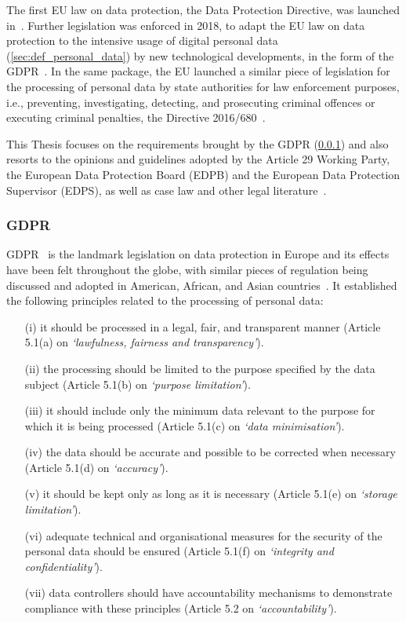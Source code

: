 The first EU law on data protection, the Data Protection Directive, was launched in~\citeyear{noauthor_directive_1995}.
Further legislation was enforced in 2018, to adapt the EU law on data protection to the intensive usage of digital personal data (\ref{sec:def_personal_data}) by new technological developments, in the form of the GDPR~\citeyearpar{noauthor_regulation_2016}.
In the same package, the EU launched a similar piece of legislation for the processing of personal data by state authorities for law enforcement purposes, i.e., preventing, investigating, detecting, and prosecuting criminal offences or executing criminal penalties, the Directive 2016/680~\citeyearpar{noauthor_directive_2016}.

This Thesis focuses on the requirements brought by the GDPR (\ref{sec:def_gdpr}) and also resorts to the opinions and guidelines adopted by the Article 29 Working Party, the European Data Protection Board (EDPB) and the European Data Protection Supervisor (EDPS), as well as case law and other legal literature~\citep{european_union_agency_for_fundamental_rights_and_council_of_europe_handbook_2018}.

\subsubsection{GDPR}
\label{sec:def_gdpr}

GDPR~\citeyearpar{noauthor_regulation_2016} is the landmark legislation on data protection in Europe and its effects have been felt throughout the globe, with similar pieces of regulation being discussed and adopted in American, African, and Asian countries~\citep{bradford_brussels_2019}.
It established the following principles related to the processing of personal data:
\begin{enumerate}
    \item [(i)] it should be processed in a legal, fair, and transparent manner (Article 5.1(a) on \textit{`lawfulness, fairness and transparency'}).
    \item [(ii)] the processing should be limited to the purpose specified by the data subject (Article 5.1(b) on \textit{`purpose limitation'}).
    \item [(iii)] it should include only the minimum data relevant to the purpose for which it is being processed (Article 5.1(c) on \textit{`data minimisation'}).
    \item [(iv)] the data should be accurate and possible to be corrected when necessary (Article 5.1(d) on \textit{`accuracy'}).
    \item [(v)] it should be kept only as long as it is necessary (Article 5.1(e) on \textit{`storage limitation'}).
    \item [(vi)] adequate technical and organisational measures for the security of the personal data should be ensured (Article 5.1(f) on \textit{`integrity and confidentiality'}).
    \item [(vii)] data controllers should have accountability mechanisms to demonstrate compliance with these principles (Article 5.2 on \textit{`accountability'}).
\end{enumerate}

